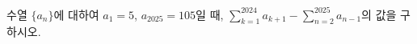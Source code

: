 수열 $\{a_n\}$에 대하여 $a_1=5$, $a_{2025}=105$일 때, $\displaystyle\sum_{k=1}^{2024} a_{k+1}-\sum_{n=2}^{2025} a_{n-1}$의 값을 구하시오.
